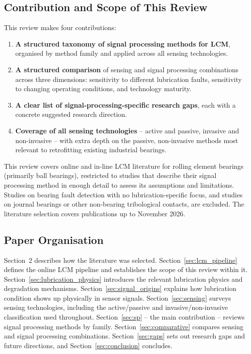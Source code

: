 \subsection{Contribution and Scope of This Review}
\label{subsec:contribution}

This review makes four contributions:
\begin{enumerate}
    \item \textbf{A structured taxonomy of signal processing methods for LCM}, organised by method family and applied across all sensing technologies.
    \item \textbf{A structured comparison} of sensing and signal processing combinations across three dimensions: sensitivity to different lubrication faults, sensitivity to changing operating conditions, and technology maturity.
    \item \textbf{A clear list of signal-processing-specific research gaps}, each with a concrete suggested research direction.
    \item \textbf{Coverage of all sensing technologies} -- active and passive, invasive and non-invasive -- with extra depth on the passive, non-invasive methods most relevant to retrofitting existing industrial bearings.
\end{enumerate}

This review covers online and in-line LCM literature for rolling element bearings (primarily ball bearings), restricted to studies that describe their signal processing method in enough detail to assess its assumptions and limitations. Studies on bearing fault detection with no lubrication-specific focus, and studies on journal bearings or other non-bearing tribological contacts, are excluded. The literature selection covers publications up to November 2026.

\subsection{Paper Organisation}
\label{subsec:organisation}
Section~2 describes how the literature was selected. Section~\ref{sec:lcm_pipeline} defines the online LCM pipeline and establishes the scope of this review within it. Section~\ref{sec:lubrication_physics} introduces the relevant lubrication physics and degradation mechanisms. Section~\ref{sec:signal_origins} explains how lubrication condition shows up physically in sensor signals. Section~\ref{sec:sensing} surveys sensing technologies, including the active/passive and invasive/non-invasive classification used throughout. Section~\ref{sec:sp} -- the main contribution -- reviews signal processing methods by family. Section~\ref{sec:comparative} compares sensing and signal processing combinations. Section~\ref{sec:gaps} sets out research gaps and future directions, and Section~\ref{sec:conclusion} concludes.
